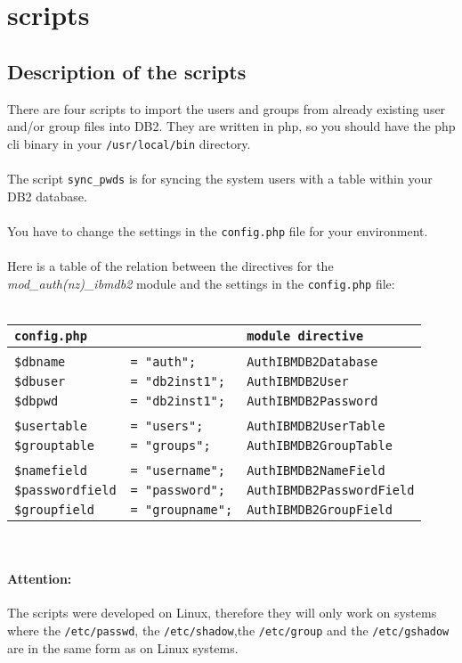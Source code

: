 \documentclass[11pt,a4paper]{article}
\begin{document}
\section{scripts}
\subsection{Description of the scripts}
There are four scripts to import the users and groups from already existing user and/or group files into DB2. They are written in php, so you should have the php cli binary in your {\tt /usr/local/bin} directory.\\
\\
The script {\tt sync\_pwds} is for syncing the system users with a table within your DB2 database.\\
\\
You have to change the settings in the {\tt config.php} file for your environment.\\
\\
Here is a table of the relation between the directives for the \emph{mod\_auth(nz)\_ibmdb2} module
and the settings in the {\tt config.php} file:\\
\\
\begin{tabular}{@{} lll @{}}
{\tt config.php} & & {\tt module directive}\\
\hline
& & \\
{\tt \$dbname} & {\tt = "auth";} & {\tt AuthIBMDB2Database} \\
{\tt \$dbuser} & {\tt = "db2inst1";} & {\tt AuthIBMDB2User} \\
{\tt \$dbpwd} & {\tt = "db2inst1";} & {\tt AuthIBMDB2Password} \\
& & \\
{\tt \$usertable} & {\tt = "users";} & {\tt AuthIBMDB2UserTable} \\
{\tt \$grouptable} & {\tt = "groups";} & {\tt AuthIBMDB2GroupTable} \\
& & \\
{\tt \$namefield} & {\tt = "username";} & {\tt AuthIBMDB2NameField} \\	
{\tt \$passwordfield} & {\tt = "password";} & {\tt AuthIBMDB2PasswordField} \\
{\tt \$groupfield} & {\tt = "groupname";} & {\tt AuthIBMDB2GroupField} \\
\end{tabular}
\\
\paragraph{Attention:}{The scripts were developed on Linux, therefore they will only work on systems where the {\tt /etc/passwd}, the {\tt /etc/shadow},the {\tt /etc/group} and the {\tt /etc/gshadow} are in the same form as on Linux systems.}
\end{document}
